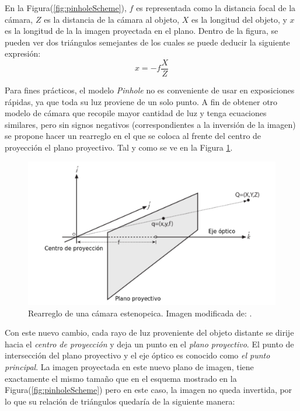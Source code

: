 En la Figura(\ref{fig:pinholeScheme}), $f$ es representada como la distancia focal de la cámara, $Z$ es la distancia de la cámara al objeto, $X$ es la longitud del objeto, y $x$ es la longitud de la la imagen proyectada en el plano. Dentro de la figura, se pueden ver dos triángulos semejantes de los cuales se puede deducir la siguiente expresión:
\[x = -f \frac{X}{Z}\]
	
Para fines prácticos, el modelo \textit{Pinhole} no es conveniente de usar en exposiciones rápidas, ya que toda su luz proviene de un solo punto. A fin de obtener otro modelo de cámara que recopile mayor cantidad de luz y tenga ecuaciones similares, pero sin signos negativos (correspondientes a la inversión de la imagen) se propone hacer un rearreglo en el que se coloca al frente del centro de proyección el plano proyectivo. Tal y como se ve en la Figura \ref{fig:rearrange_pinhole_scheme}.
	
\begin{figure}
	\centering
	\includegraphics[scale=0.8]{images/rearrange_pinhole_scheme.pdf}
    \caption{Rearreglo de una cámara estenopeica. Imagen modificada de: \cite{bradski2008learning}.}
    \label{fig:rearrange_pinhole_scheme}
\end{figure} 

Con este nuevo cambio, cada rayo de luz proveniente del objeto distante se dirije hacia el \textit{centro de proyección} y deja un punto en el \textit{plano proyectivo}. El punto de intersección del plano proyectivo y el eje óptico es conocido como \textit{el punto principal}. La imagen proyectada en este nuevo plano de imagen, tiene exactamente el mismo tamaño que en el esquema mostrado en la Figura(\ref{fig:pinholeScheme}) pero en este caso, la imagen no queda invertida, por lo que su relación de triángulos quedaría de la siguiente manera: 

